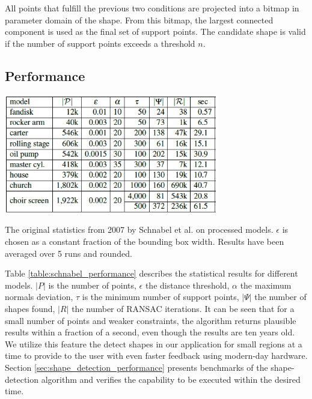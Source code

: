 \par

All points that fulfill the previous two conditions are projected into a bitmap in parameter domain of the shape. From this bitmap, the largest connected component is used as the final set of support points. The candidate shape is valid if the number of support points exceeds a threshold $n$. 


\subsection{Performance}
\label{sec:performance}

\begin{table}
    \centering
    \includegraphics[width=0.7\textwidth]{Shape_Detection/schnabel-performance.png}
    \caption[Original statistics of the shape detection algorithm by Schabel et al.]{The original statistics  from 2007 by Schnabel et al. \cite{schnabel-2007-efficient} on processed models. $\epsilon$ is chosen as a constant fraction of the bounding box width. Results have been averaged over 5 runs and rounded.}
    \label{table:schnabel_performance}
\end{table}

Table \ref{table:schnabel_performance} describes the statistical results for different models. $|P|$ is the number of points, $\epsilon$ the distance threshold, $\alpha$ the maximum normals deviation, $\tau$ is the minimum number of support points, $|\Psi|$ the number of shapes found, $|R|$ the number of RANSAC iterations. 
It can be seen that for a small number of points and weaker constraints, the algorithm returns plausible results within a fraction of a second, even though the results are ten years old. We utilize this feature the detect shapes in our application for small regions at a time to provide to the user with even faster feedback using modern-day hardware. Section \ref{sec:shape_detection_performance} presents benchmarks of the shape-detection algorithm and verifies the capability to be executed within the desired time. 


